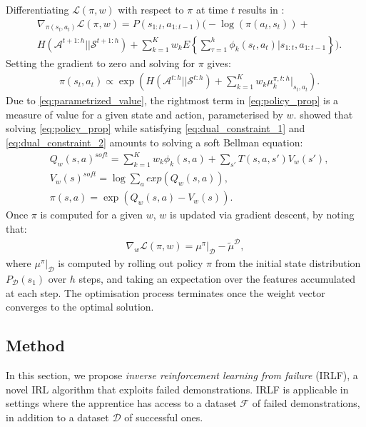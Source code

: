 \documentclass[a4paper,11pt]{report}
\begin{document}
Differentiating $\mathcal{L}(\pi,w)$ with respect to $\pi$ at time $t$ results in \cite[p.\ 186]{ziebart2010modelingthesis}:
\begin{equation}
 \begin{split}
 &\nabla_{\pi(s_t,a_t)}\mathcal{L}(\pi,w) = P(s_{1:t},a_{1:t-1})\Bigg(-\log(\pi(a_t,s_t))+ \\
& H(\mathcal{A}^{t+1:h}||\mathcal{S}^{t+1:h})
 +\sum_{k=1}^K w_kE\left\{\sum_{\tau=1}^h \phi_k(s_t,a_t)|s_{1:t},a_{1:t-1}\right\}\Bigg). \label{eqn:zieb_lagragian_derivative}
 \end{split}
\end{equation}
Setting the gradient to zero and solving for $\pi$ gives:
\begin{equation}
\label{eq:policy_prop}
	\begin{split}
	&\pi(s_t,a_t) \propto \exp\left(H(\mathcal{A}^{t:h}||\mathcal{S}^{t:h})+\sum^K_{k=1} w_k\mu_k^{\pi,t:h}|_{s_t,a_t}\right).
	\end{split}
\end{equation}
Due to \eqref{eq:parametrized_value}, the rightmost term in \eqref{eq:policy_prop} is a measure of value for a given state and action, parameterised by $w$. \cite{ziebart2010modelingthesis} showed that solving \eqref{eq:policy_prop} while satisfying \eqref{eq:dual_constraint_1} and \eqref{eq:dual_constraint_2} amounts to solving a soft Bellman equation:
	\begin{equation}
		\begin{split}
	&Q_w(s,a)^{soft} = \sum_{k=1}^Kw_k\phi_k(s,a) + \sum_{s'}T(s,a,s')V_w(s'),\\	
	&V_w(s)^{soft} = \log\sum_{a}exp(Q_w(s,a)),\\
	&\pi(s,a) = \exp(Q_w(s,a) - V_w(s)).
	\end{split}
	\label{eq:soft_backup}
	\end{equation}
Once $\pi$ is computed for a given $w$, $w$ is updated via gradient descent, by noting that:
 \begin{align}
   \label{eq:weight_update}
   \nabla_{w}\mathcal{L}(\pi,w) =\mu^\pi|_{\mathcal{D}} - \widetilde{\mu}^{\mathcal{D}},
 \end{align}
where $\mu^\pi|_{\mathcal{D}}$ is computed by rolling out policy $\pi$ from the initial state distribution $P_{\mathcal{D}}(s_1)$ over $h$ steps, and taking an expectation over the features accumulated at each step. The optimisation process terminates once the weight vector converges to the optimal solution.

\subsection{Method}
In this section, we propose \emph{inverse reinforcement learning from failure} (IRLF), a novel IRL algorithm that exploits failed demonstrations.  IRLF is applicable in settings where the apprentice has access to a dataset $\mathcal{F}$ of failed demonstrations, in addition to a dataset $\mathcal{D}$ of successful ones.
\end{document}
